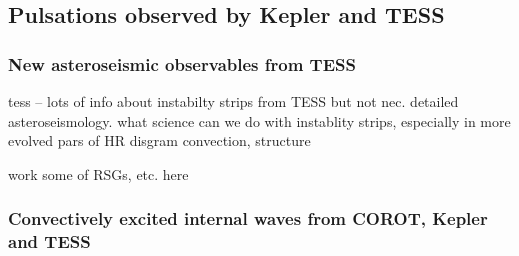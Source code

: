 {\color{blue}
\subsection{Pulsations observed by Kepler and TESS}



\subsubsection{New asteroseismic observables from TESS}

tess -- lots of info about instabilty strips from TESS but not nec. detailed asteroseismology.  what science can we do with instablity strips, especially in more evolved pars of HR disgram  convection, structure

work some of  RSGs, etc. here

\subsubsection{Convectively excited internal waves from COROT, Kepler and TESS}


}